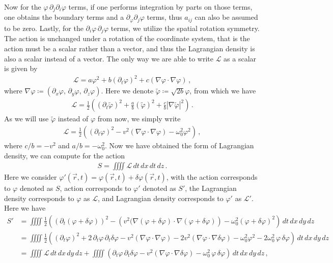 \documentclass[11pt, onesided]{book}
\theoremstyle{break}
\theoremstyle{break}
\newcommand{\pd}{\partial}
\newcommand{\that}[1]{\widetilde{#1}}
\begin{document}
Now for the $\varphi\, \pd_j \pd_i \varphi$ terms, if one performs integration by parts on those terms, one obtains the boundary terms and a $\pd_ \varphi \pd_j \varphi$ terms, thus $a_{ij}$ can also be assumed to be zero. Lastly, for the $\pd_i \varphi\, \pd_j \varphi$ terms, we utilize the spatial rotation symmetry. The action is unchanged under a rotation of the coordinate system, that is the action must be a scalar rather than a vector, and thus the Lagrangian density is also a scalar instead of a vector. The only way we are able to write $\mathcal{L}$ as a scalar is given by
\begin{align*}
\mathcal{L} = a\varphi^2 + b(\pd_t \varphi)^2 + c (\nabla\varphi \cdot \nabla \varphi)\,,
\end{align*}
where $\nabla \varphi \coloneqq (\pd_x \varphi,\, \pd_y \varphi, \, \pd_z \varphi)$. Here we denote $\that{\varphi} \coloneqq \sqrt{2b}\varphi$, from which we have
\begin{align*}
\mathcal{L} =\frac{1}{2}\left(  \left( \pd_t \that{\varphi}\right)^2 + \frac{a}{b}\left( \that{\varphi}\right)^2 + \frac{c}{b} \left|\nabla \that{\varphi}\right|^2 \right)\,.
\end{align*}
As we will use $\that{\varphi}$ instead of $\varphi$ from now, we simply write
\begin{align}
\mathcal{L} =\frac{1}{2}\left( (\pd_t \varphi)^2 - v^2 (\nabla \varphi \cdot \nabla \varphi) - \omega_0^2 \varphi^2\right)\,,
\end{align}
where $c/b = -v^2$ and $a/b = -\omega_0^2$. Now we have obtained the form of Lagrangian density, we can compute for the action
\begin{align*}
S =\iiiint \mathcal{L}\,dt\,dx\,dt\,dz\,.
\end{align*}
Here we consider $\varphi'(\vec{r},t) = \varphi(\vec{r},t) + \delta \varphi(\vec{r},t)$, with the action corresponds to $\varphi$ denoted as $S$, action corresponds to $\varphi'$ denoted as $S'$, the Lagrangian density corresponds to $\varphi$ as $\mathcal{L}$, and Lagrangian density corresponds to $\varphi'$ as $\mathcal{L}'$. Here we have
\begin{align*}
S' &=  \iiiint \frac{1}{2} \left(\left( \pd_t(\varphi+ \delta \varphi)\right)^2 - \left( v^2 (\nabla(\varphi + \delta \varphi) \cdot \nabla(\varphi + \delta \varphi)\right) - \omega_0^2 ( \varphi + \delta \varphi)^2  \right)  \,dt\,dx\,dy\,dz\\
&= \iiiint \frac{1}{2} \left( (\pd_t \varphi)^2 + 2\,\pd_t \varphi\, \pd_t\delta\varphi - v^2 (\nabla\varphi \cdot \nabla\varphi) - 2v^2 (\nabla\varphi \cdot \nabla\delta \varphi) - \omega_0^2 \varphi^2 - 2\omega_0^2\, \varphi\, \delta \varphi\right) \,dt\,dx\,dy\,dz\\
&= \iiiint \mathcal{L} \,dt\,dx\,dy\,dz  + \iiiint (\pd_t \varphi\, \pd_t \delta \varphi - v^2 (\nabla\varphi \cdot \nabla\delta \varphi) - \omega_0^2\, \varphi\, \delta \varphi) \,dt\,dx\,dy\,dz\,,
\end{align*}
\end{document}
